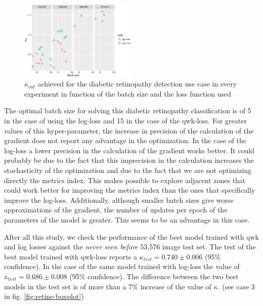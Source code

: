 \documentclass[times,twocolumn,final,authoryear]{elsarticle}
\begin{document}
\begin{figure}[!htb]
	\centering
	\includegraphics[width=0.5\textwidth]{./graphs/retine-results.eps}
	\caption{$\kappa_{val}$ achieved for the diabetic retinopathy detection use case in every experiment in function of the batch size and the loss function used}
	\label{fig:best}
\end{figure}

The optimal batch size for solving this diabetic retinopathy classification is of 5 in the case of using the log-loss and 15 in the case of the qwk-loss. For greater values of this hyper-parameter, the increase in precision of the calculation of the gradient does not report any advantage in the optimization. In the case of the log-loss a lower precision in the calculation of the gradient works better. It could probably be due to the fact that this imprecision in the calculation increases the stochasticity of the optimization and due to the fact that we are not optimizing directly the metrics index. This makes possible to explore adjacent zones that could work better for improving the metrics index than the ones that specifically improve the log-loss. Additionally, although smaller batch sizes give worse approximations of the gradient, the number of updates per epoch of the parameters of the model is greater. This seems to be an advantage in this case.

After all this study, we check the performance of the best model trained with qwk and log losses against the \emph{never seen before} 53,576 image test set. The test of the best model trained with qwk-loss reports a $\kappa_{test} = 0.740 \pm 0.006$ (95\% confidence). In the case of the same model trained with log-loss the value of $\kappa_{test} = 0.686 \pm 0.008$ (95\% confidence). The difference between the two best models in the test set is of more than a 7\% increase of the value of $\kappa$. (see case 3 in fig. \ref{fig:retine-boxplot})
\end{document}
